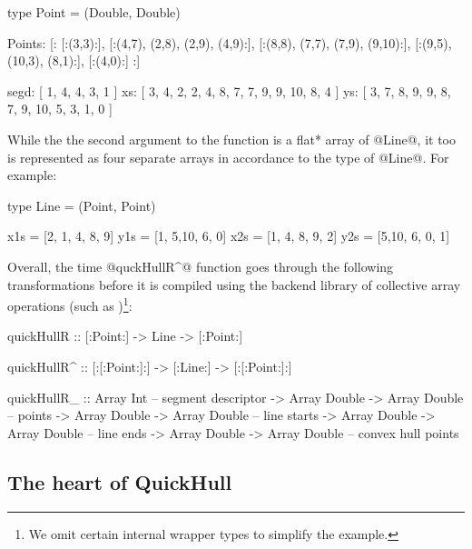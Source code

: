 \documentclass[preamble.tex]{subfiles}
\begin{document}
\begin{hscode}
type Point = (Double, Double)

Points:
  [:
     [:(3,3):],
     [:(4,7), (2,8),  (2,9), (4,9):],
     [:(8,8), (7,7),  (7,9), (9,10):],
     [:(9,5), (10,3), (8,1):],
     [:(4,0):]
  :]


segd: [ 1, 4, 4, 3, 1 ]
xs:   [ 3, 4, 2, 2, 4, 8, 7, 7,  9, 9, 10, 8, 4 ]
ys:   [ 3, 7, 8, 9, 9, 8, 7, 9, 10, 5,  3, 1, 0 ]
\end{hscode}


While the the second argument to the function is a \*flat* array of @Line@, it too is represented as four separate arrays in accordance to the type of @Line@. For example:


\begin{hscode}
type Line = (Point, Point)

x1s = [2, 1, 4, 8, 9]
y1s = [1, 5,10, 6, 0]
x2s = [1, 4, 8, 9, 2]
y2s = [5,10, 6, 0, 1]
\end{hscode}


Overall, the time @quckHullR^@ function goes through the following transformations before it is compiled using the backend library of collective array operations (such as \LiveFusion)\footnote{We omit certain internal wrapper types to simplify the example.}:

\begin{hscode}[literate={^}{{$^\uparrow$}}1,]
quickHullR  :: [:Point:] -> Line -> [:Point:]


quickHullR^ :: [:[:Point:]:] -> [:Line:] -> [:[:Point:]:]


quickHullR_ :: Array Int                      -- segment descriptor
            -> Array Double -> Array Double   -- points
            -> Array Double -> Array Double   -- line starts
            -> Array Double -> Array Double   -- line ends            
            -> Array Double -> Array Double   -- convex hull points
\end{hscode}

\subsection{The heart of QuickHull}
\end{document}
